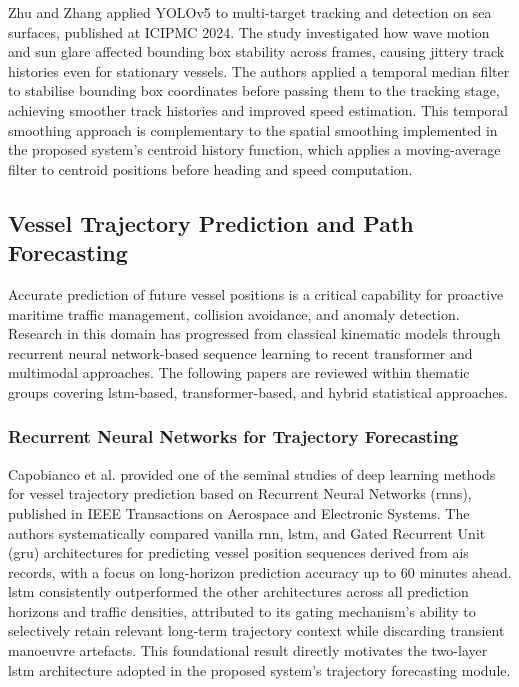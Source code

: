 Zhu and Zhang \cite{Zhu2024} applied YOLOv5 to multi-target tracking and detection
on sea surfaces, published at ICIPMC 2024. The study investigated how wave motion
and sun glare affected bounding box stability across frames, causing jittery track
histories even for stationary vessels. The authors applied a temporal median filter
to stabilise bounding box coordinates before passing them to the tracking stage,
achieving smoother track histories and improved speed estimation. This temporal
smoothing approach is complementary to the spatial smoothing implemented in the
proposed system's centroid history function, which applies a moving-average filter
to centroid positions before heading and speed computation.
 
\subsection{Vessel Trajectory Prediction and Path Forecasting}
Accurate prediction of future vessel positions is a critical capability for
proactive maritime traffic management, collision avoidance, and anomaly detection.
Research in this domain has progressed from classical kinematic models through
recurrent neural network-based sequence learning to recent transformer and
multimodal approaches. The following papers are reviewed within thematic groups
covering \gls{lstm}-based, transformer-based, and hybrid statistical approaches.
 
\subsubsection{\textbf{Recurrent Neural Networks for Trajectory Forecasting}}
Capobianco et al. \cite{Capobianco2021} provided one of the seminal studies of
deep learning methods for vessel trajectory prediction based on Recurrent Neural
Networks (\glspl{rnn}), published in IEEE Transactions on Aerospace and Electronic Systems.
The authors systematically compared vanilla \gls{rnn}, \gls{lstm}, and Gated Recurrent Unit
(\gls{gru}) architectures for predicting vessel position sequences derived from \gls{ais}
records, with a focus on long-horizon prediction accuracy up to 60 minutes ahead.
\gls{lstm} consistently outperformed the other architectures across all prediction horizons
and traffic densities, attributed to its gating mechanism's ability to selectively
retain relevant long-term trajectory context while discarding transient manoeuvre
artefacts. This foundational result directly motivates the two-layer \gls{lstm} architecture
adopted in the proposed system's trajectory forecasting module.
 
